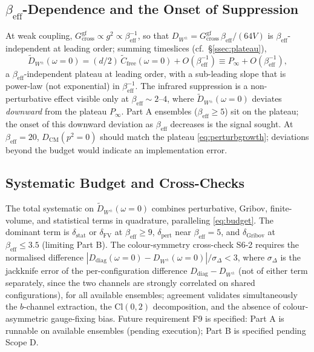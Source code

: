 \documentclass[11pt,a4paper]{article}
\theoremstyle{plain}
\theoremstyle{definition}
\theoremstyle{remark}
\newcommand{\Cl}{\mathrm{Cl}}
\newcommand{\Gcrossgf}{G_{\mathrm{cross}}^{\mathrm{gf}}}
\newcommand{\DW}{D_{W^{\pm}}}
\newcommand{\DWt}{\widetilde{D}_{W^{\pm}}}
\newcommand{\be}{\beta_{\mathrm{eff}}}
\begin{document}
\subsection{$\be$-Dependence and the Onset of Suppression}
\label{ssec:partA}

At weak coupling, $\Gcrossgf\propto g^2\propto\be^{-1}$, so that
$\DW=\Gcrossgf\,\be/(64V)$ is $\be$-independent at leading order; summing
timeslices (cf.\ \S\ref{ssec:plateau}),
\begin{equation}
  \DWt(\omega{=}0)=(d/2)\,\widetilde C_{\mathrm{free}}(\omega{=}0)+O(\be^{-1})
  \equiv P_\infty+O(\be^{-1}),
  \label{eq:perturbgrowth}
\end{equation}
a $\be$-independent plateau at leading order, with a sub-leading slope that
is power-law (not exponential) in $\be^{-1}$. The \cite{CM,Bo} infrared
suppression is a non-perturbative effect visible only at $\be\sim2$--$4$,
where $\DWt(\omega{=}0)$ deviates \emph{downward} from the plateau $P_\infty$.
Part A ensembles ($\be\ge5$) sit on the plateau; the onset of this downward
deviation as $\be$ decreases is the signal sought. At $\be=20$,
$D_{\mathrm{CM}}(p^2{=}0)$ should match the plateau \eqref{eq:perturbgrowth};
deviations beyond the  budget would indicate an
implementation error.

\subsection{Systematic Budget and Cross-Checks}
\label{ssec:S62}

The total systematic on $\DWt(\omega{=}0)$ combines perturbative, Gribov,
finite-volume, and statistical terms in quadrature, paralleling
\eqref{eq:budget}. The dominant term is $\delta_{\mathrm{stat}}$ or
$\delta_{\mathrm{FV}}$ at $\be\ge9$, $\delta_{\mathrm{pert}}$ near
$\be=5$, and $\delta_{\mathrm{Gribov}}$ at $\be\le3.5$ (limiting Part B).
The colour-symmetry cross-check S6-2 requires the normalised difference
$|D_{\mathrm{diag}}(\omega{=}0)-\DW(\omega{=}0)|/\sigma_{\Delta}<3$, where
$\sigma_{\Delta}$ is the jackknife error of the per-configuration difference
$D_{\mathrm{diag}}-\DW$ (not of either term separately, since the two
channels are strongly correlated on shared configurations),
for all available ensembles; agreement validates simultaneously the
$b$-channel extraction, the $\Cl(0,2)$ decomposition, and the absence of
colour-asymmetric gauge-fixing bias. Future requirement F9 is specified:
Part A is runnable on available ensembles (pending execution); Part B is
specified pending Scope D.
\end{document}
